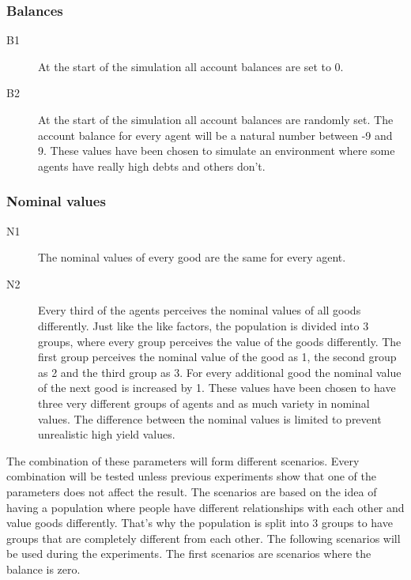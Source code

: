 \documentclass[twoside,openright]{uva-bachelor-thesis}
\begin{document}
\subsubsection{Balances}
\begin{description}
\item[B1] At the start of the simulation all account balances are set to 0.
\item[B2] At the start of the simulation all account balances are randomly set. The account balance for every agent will be a natural number between -9 and 9. These values have been chosen to simulate an environment where some agents have really high debts and others don't.
\end{description}
\subsubsection{Nominal values}
\begin{description}
\item[N1] The nominal values of every good are the same for every agent.
\item[N2] Every third of the agents perceives the nominal values of all goods differently. Just like the like factors, the population is divided into 3 groups, where every group perceives the value of the goods differently. The first group perceives the nominal value of the good as 1, the second group as 2 and the third group as 3. For every additional good the nominal value of the next good is increased by 1. These values have been chosen to have three very different groups of agents and as much variety in nominal values. The difference between the nominal values is limited to prevent unrealistic high yield values.
\end{description} 
The combination of these parameters will form different scenarios. Every combination will be tested unless previous experiments show that one of the parameters does not affect the result. The scenarios are based on the idea of having a population where people have different relationships with each other and value goods differently. That’s why the population is split into 3 groups to have groups that are completely different from each other. The following scenarios will be used during the experiments.
The first scenarios are scenarios where the balance is zero.
\end{document}
